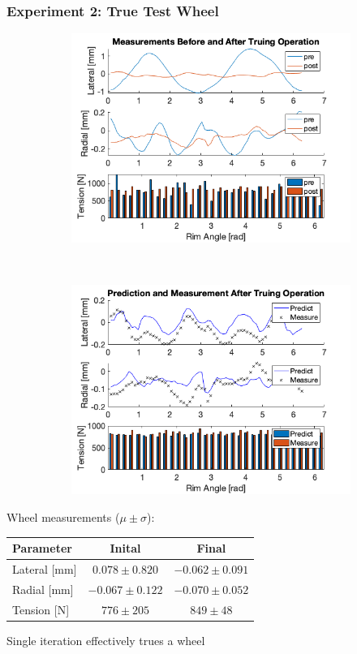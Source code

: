 \documentclass[mathserif]{beamer}
\begin{document}
\begin{frame}
\frametitle{Experiment 2: True Test Wheel}
\begin{figure}
        \centering
        \begin{subfigure}[b]{0.45\textwidth}
            \includegraphics[width=\textwidth]{exp2_pre_post}
        \end{subfigure}
        ~
        \begin{subfigure}[b]{0.45\textwidth}
            \includegraphics[width=\textwidth]{exp2_predict_measure}
        \end{subfigure}
\end{figure}
Wheel measurements ($\mu \pm \sigma$):
\centering
\begin{tabular}{| l | c | c |}
    \hline
    Parameter & Inital & Final \\ \hline
    Lateral [mm] & $0.078\pm0.820$ &$-0.062\pm 0.091$ \\ \hline 
    Radial [mm] &$-0.067\pm0.122$& $-0.070\pm0.052$ \\ \hline 
    Tension [N] &$776\pm205$& $849\pm48$ \\ \hline 
\end{tabular}
\begin{block}{}
    Single iteration effectively trues a wheel
\end{block}
\end{frame}
\end{document}
